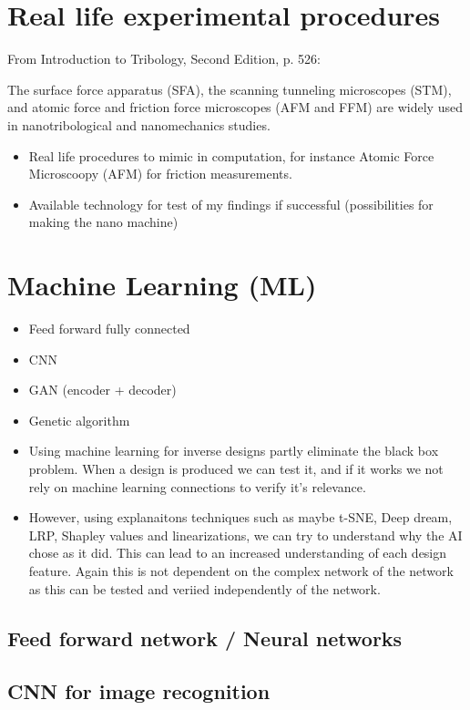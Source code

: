 \section{Real life experimental procedures}
From Introduction to Tribology, Second Edition, p. 526: \par
The surface force apparatus (SFA), the scanning tunneling microscopes (STM), and atomic force and friction force microscopes (AFM and FFM) are widely used in nanotribological and nanomechanics studies.



\begin{itemize}
  \item Real life procedures to mimic in computation, for instance Atomic Force Microscoopy (AFM) for friction measurements.
  \item Available technology for test of my findings if successful (possibilities for making the nano machine) 
\end{itemize}
\section{Machine Learning (ML)}
\begin{itemize}
  \item Feed forward fully connected
  \item CNN
  \item GAN (encoder + decoder)
  \item Genetic algorithm
  \item Using machine learning for inverse designs partly eliminate the black box problem. When a design is produced we can test it, and if it works we not rely on machine learning connections to verify it's relevance. 
  \item However, using explanaitons techniques such as maybe t-SNE, Deep dream, LRP, Shapley values and linearizations, we can try to understand why the AI chose as it did. This can lead to an increased understanding of each design feature. Again this is not dependent on the complex network of the network as this can be tested and veriied independently of the network. 
\end{itemize}

\subsection{Feed forward network / Neural networks}
\subsection{CNN for image recognition}
